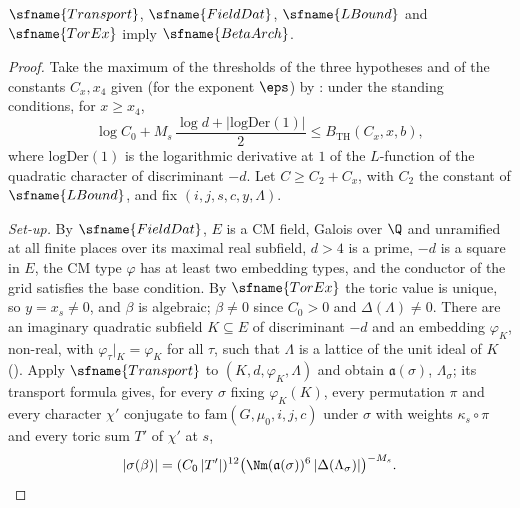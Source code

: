 \begin{theorem}\label{pf:fit:betaarch}
$\sfname{Transport}$, $\sfname{FieldDat}$, $\sfname{LBound}$ and $\sfname{TorEx}$ imply $\sfname{BetaArch}$.
\end{theorem}

\begin{proof}
Take the maximum of the thresholds of the three hypotheses and of the constants $C_x,x_4$ given (for the exponent $\eps$) by
: under the standing conditions, for $x\ge x_4$,
\begin{equation}\label{eq:pf:fit:cmconst}
\log C_0+M_s\,\frac{\log d+|\mathrm{logDer}(1)|}2\le B_{\mathrm{TH}}(C_x,x,b),
\end{equation}
where $\mathrm{logDer}(1)$ is the logarithmic derivative at $1$ of the $L$-function of the quadratic character of discriminant
$-d$. Let $C\ge C_2+C_x$, with $C_2$ the constant of $\sfname{LBound}$, and fix $(i,j,s,c,y,\Lambda)$.

\emph{Set-up.} By $\sfname{FieldDat}$, $E$ is a CM field, Galois over $\Q$ and unramified at all finite places over its
maximal real subfield, $d>4$ is a prime, $-d$ is a square in $E$, the CM type $\varphi$ has at least two embedding types, and the
conductor of the grid satisfies the base condition. By $\sfname{TorEx}$ the toric value is unique, so $y=x_s\ne0$, and $\beta$ is algebraic; $\beta\ne0$ since
$C_0>0$ and $\Delta(\Lambda)\ne0$. There are an imaginary quadratic subfield $K\subseteq E$ of discriminant $-d$ and an
embedding $\varphi_K$, non-real, with $\varphi_\tau|_K=\varphi_K$ for all $\tau$, such that $\Lambda$ is a lattice of the unit
ideal of $K$ (). Apply $\sfname{Transport}$ to
$(K,d,\varphi_K,\Lambda)$ and obtain $\mathfrak a(\sigma)$, $\Lambda_\sigma$; its transport formula gives, for every $\sigma$
fixing $\varphi_K(K)$, every permutation $\pi$ and every character $\chi'$ conjugate to $\mathrm{fam}(G,\mu_0,i,j,c)$ under
$\sigma$ with weights $\kappa_s\circ\pi$ and every toric sum $T'$ of $\chi'$ at $s$,
\[
|\sigma(\beta)|=(C_0\,|T'|)^{12}\bigl(\Nm(\mathfrak a(\sigma))^6\,|\Delta(\Lambda_\sigma)|\bigr)^{-M_s}.
\]


\end{proof}
